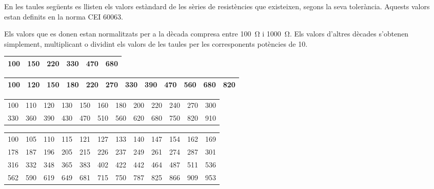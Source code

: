 En les taules següents es llisten els valors estàndard de les sèries de resistències que existeixen,  segons la seva tolerància. Aquests valors estan definits en la norma CEI 60063.

Els valors que es donen estan normalitzats per a la dècada compresa
entre \SI{100}{\ohm} i \SI{1000}{\ohm}. Els valors d'altres dècades
s'obtenen simplement, multiplicant o dividint els valors de les
taules per les corresponents  potències de 10.

\begin{center}
   \begin{tabular}{cccccc}
   \toprule[1pt]
   100 & 150 & 220 & 330 & 470 &  680  \\
   \bottomrule[1pt]
   \end{tabular}
\end{center}
\vspace{5mm}

\begin{center}
   \begin{tabular}{cccccccccccc}
   \toprule[1pt]
   100 & 120 & 150 & 180 & 220 & 270 & 330 & 390 & 470 & 560 & 680 & 820 \\
   \bottomrule[1pt]
   \end{tabular}
\end{center}
\vspace{5mm}

\begin{center}
   \begin{tabular}{cccccccccccc}
   \toprule[1pt]
   100 & 110 & 120 & 130 & 150 & 160 & 180 & 200 & 220 & 240 & 270 & 300 \\
   330 & 360 & 390 & 430 & 470 & 510 & 560 & 620 & 680 & 750 & 820 & 910 \\
   \bottomrule[1pt]
   \end{tabular}
\end{center}
\vspace{5mm}

\begin{center}
   \begin{tabular}{cccccccccccc}
   \toprule[1pt]
   100 & 105 & 110 & 115 & 121 & 127 & 133 & 140 & 147 & 154 & 162 & 169 \\
   178 & 187 & 196 & 205 & 215 & 226 & 237 & 249 & 261 & 274 & 287 & 301 \\
   316 & 332 & 348 & 365 & 383 & 402 & 422 & 442 & 464 & 487 & 511 & 536 \\
   562 & 590 & 619 & 649 & 681 & 715 & 750 & 787 & 825 & 866 & 909 & 953 \\
   \bottomrule[1pt]
   \end{tabular}
\end{center}
\vspace{5mm}

